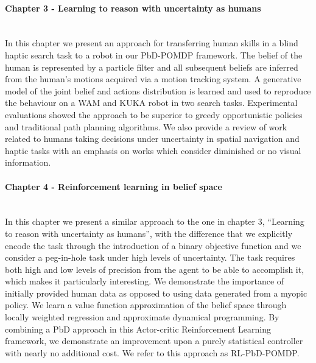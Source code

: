 \begin{minipage}[c]{0.9\textwidth}
\paragraph{Chapter 3 - Learning to reason with uncertainty as humans}\\
In this chapter we present an approach for transferring human skills in a blind haptic 
search task to a robot in our PbD-POMDP framework. The belief of the human is represented by a particle filter and 
all subsequent beliefs are inferred from the human's motions acquired via a motion tracking
system. A generative model of the joint belief and actions distribution is learned and used
to reproduce the behaviour on a WAM and KUKA robot in two search tasks. Experimental 
evaluations showed the approach to be superior to greedy opportunistic policies and traditional
path planning algorithms. 
We also provide a review of work related to humans taking decisions under uncertainty 
in spatial navigation and haptic tasks with an emphasis on works which consider diminished or no 
visual information. 
\end{minipage}

\begin{minipage}[c]{0.9\textwidth}
\paragraph{Chapter 4 - Reinforcement learning in belief space}\\

In this chapter we present a similar approach to the one in chapter 3, ``Learning to reason with uncertainty as humans'',
with the difference that we explicitly encode the task through the introduction of a binary objective function and we consider 
a peg-in-hole task under high levels of uncertainty. 
The task requires both high and low levels of precision from the agent to be able to accomplish it, which makes it particularly interesting. 
We demonstrate the importance of initially provided human data as opposed to using data generated from a myopic policy.
We learn a value function approximation of the belief space through locally weighted regression and approximate dynamical 
programming. By combining a PbD approach in this Actor-critic Reinforcement Learning framework, we demonstrate an improvement upon 
a purely statistical controller with nearly no additional cost. We refer to this approach as RL-PbD-POMDP. 
\end{minipage}

